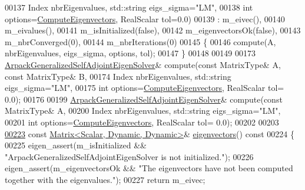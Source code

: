 \begin{DoxyCode}
00137                                           Index nbrEigenvalues, std::string eigs\_sigma=\textcolor{stringliteral}{"LM"},
00138                                \textcolor{keywordtype}{int} options=\hyperlink{group__enums_ggae3e239fb70022eb8747994cf5d68b4a9ada93d8885bde32b876ba4af01d3292cc}{ComputeEigenvectors}, RealScalar tol=0.0)
00139     : m\_eivec(),
00140       m\_eivalues(),
00141       m\_isInitialized(false),
00142       m\_eigenvectorsOk(false),
00143       m\_nbrConverged(0),
00144       m\_nbrIterations(0)
00145   \{
00146     compute(A, nbrEigenvalues, eigs\_sigma, options, tol);
00147   \}
00148 
00149 
00173   \hyperlink{class_eigen_1_1_arpack_generalized_self_adjoint_eigen_solver}{ArpackGeneralizedSelfAdjointEigenSolver}& compute(\textcolor{keyword}{const} MatrixType&
       A, \textcolor{keyword}{const} MatrixType& B,
00174                                                    Index nbrEigenvalues, std::string eigs\_sigma=\textcolor{stringliteral}{"LM"},
00175                                         \textcolor{keywordtype}{int} options=\hyperlink{group__enums_ggae3e239fb70022eb8747994cf5d68b4a9ada93d8885bde32b876ba4af01d3292cc}{ComputeEigenvectors}, RealScalar tol=
      0.0);
00176   
00199   \hyperlink{class_eigen_1_1_arpack_generalized_self_adjoint_eigen_solver}{ArpackGeneralizedSelfAdjointEigenSolver}& compute(\textcolor{keyword}{const} MatrixType&
       A,
00200                                                    Index nbrEigenvalues, std::string eigs\_sigma=\textcolor{stringliteral}{"LM"},
00201                                         \textcolor{keywordtype}{int} options=\hyperlink{group__enums_ggae3e239fb70022eb8747994cf5d68b4a9ada93d8885bde32b876ba4af01d3292cc}{ComputeEigenvectors}, RealScalar tol=
      0.0);
00202 
00203 
\hyperlink{class_eigen_1_1_arpack_generalized_self_adjoint_eigen_solver_a183825135568364792a955efc55a0773}{00223}   \textcolor{keyword}{const} \hyperlink{group___core___module}{Matrix<Scalar, Dynamic, Dynamic>}& 
      \hyperlink{class_eigen_1_1_arpack_generalized_self_adjoint_eigen_solver_a183825135568364792a955efc55a0773}{eigenvectors}()\textcolor{keyword}{ const}
00224 \textcolor{keyword}{  }\{
00225     eigen\_assert(m\_isInitialized && \textcolor{stringliteral}{"ArpackGeneralizedSelfAdjointEigenSolver is not initialized."});
00226     eigen\_assert(m\_eigenvectorsOk && \textcolor{stringliteral}{"The eigenvectors have not been computed together with the
       eigenvalues."});
00227     \textcolor{keywordflow}{return} m\_eivec;

\end{DoxyCode}
